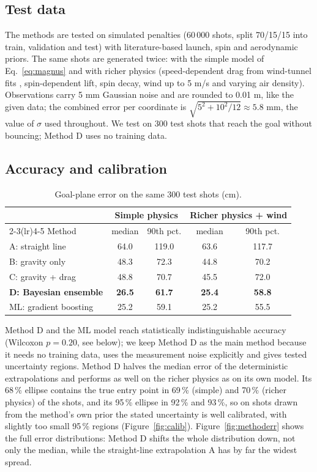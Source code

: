 \documentclass[11pt,a4paper]{article}
\begin{document}
\subsection{Test data}
The methods are tested on simulated penalties (60\,000 shots, split 70/15/15 into train, validation and test) with literature-based launch, spin and aerodynamic priors. The same shots are generated twice: with the simple model of Eq.~\eqref{eq:magnus} and with richer physics (speed-dependent drag from wind-tunnel fits \citep{goff2014}, spin-dependent lift, spin decay, wind up to 5 m/s and varying air density). Observations carry 5 mm Gaussian noise and are rounded to 0.01 m, like the given data; the combined error per coordinate is $\sqrt{5^2+10^2/12}\approx5.8$ mm, the value of $\sigma$ used throughout. We test on 300 test shots that reach the goal without bouncing; Method D uses no training data.

\subsection{Accuracy and calibration}
\begin{table}[H]
\centering
\caption{Goal-plane error on the same 300 test shots (cm).}
\label{tab:test}
\small
\begin{tabular}{@{}lcccc@{}}
\toprule
 & \multicolumn{2}{c}{Simple physics} & \multicolumn{2}{c}{Richer physics + wind}\\
\cmidrule(lr){2-3}\cmidrule(lr){4-5}
Method & median & 90th pct. & median & 90th pct.\\
\midrule
A: straight line & 64.0 & 119.0 & 63.6 & 117.7\\
B: gravity only & 48.3 & 72.3 & 44.8 & 70.2\\
C: gravity + drag & 48.8 & 70.7 & 45.5 & 72.0\\
\textbf{D: Bayesian ensemble} & \textbf{26.5} & \textbf{61.7} & \textbf{25.4} & \textbf{58.8}\\
ML: gradient boosting & 25.2 & 59.1 & 25.2 & 55.5\\
\bottomrule
\end{tabular}
\end{table}
Method D and the ML model reach statistically indistinguishable accuracy (Wilcoxon $p=0.20$, see below); we keep Method D as the main method because it needs no training data, uses the measurement noise explicitly and gives tested uncertainty regions. Method D halves the median error of the deterministic extrapolations and performs as well on the richer physics as on its own model. Its 68\,\% ellipse contains the true entry point in 69\,\% (simple) and 70\,\% (richer physics) of the shots, and its 95\,\% ellipse in 92\,\% and 93\,\%, so on shots drawn from the method's own prior the stated uncertainty is well calibrated, with slightly too small 95\,\% regions (Figure~\ref{fig:calib}).
Figure~\ref{fig:methoderr} shows the full error distributions: Method D shifts the whole distribution down, not only the median, while the straight-line extrapolation A has by far the widest spread.
\end{document}
